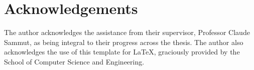\chapter*{Acknowledgements}\label{ack}

The author acknowledges the assistance from their supervisor, Professor Claude Sammut, as being integral to their progress across the thesis.
The author also acknowledges the use of this template for \LaTeX, graciously provided by the School of Computer Science and Engineering.